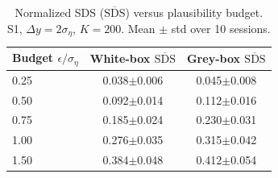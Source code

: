 \begin{table}[t]
\centering
\caption{Normalized SDS ($\overline{\mathrm{SDS}}$) versus plausibility
budget. S1, $\Delta y = 2\sigma_\eta$, $K = 200$. Mean $\pm$ std over 10 sessions.}
\label{tab:sds_budget}
\small
\begin{tabular}{@{}lcc@{}}
\toprule
\textbf{Budget $\epsilon / \sigma_\eta$} &
\textbf{White-box $\overline{\mathrm{SDS}}$} &
\textbf{Grey-box $\overline{\mathrm{SDS}}$} \\
\midrule
0.25 & 0.038$\pm$0.006 & 0.045$\pm$0.008 \\
0.50 & 0.092$\pm$0.014 & 0.112$\pm$0.016 \\
0.75 & 0.185$\pm$0.024 & 0.230$\pm$0.031 \\
1.00 & 0.276$\pm$0.035 & 0.315$\pm$0.042 \\
1.50 & 0.384$\pm$0.048 & 0.412$\pm$0.054 \\
\bottomrule
\end{tabular}
\end{table}